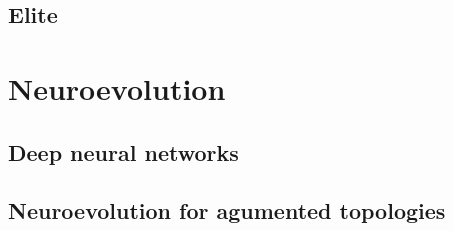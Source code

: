 \subsection{Elite}

\section{Neuroevolution}

\subsection{Deep neural networks}

\subsection{Neuroevolution for agumented topologies}
